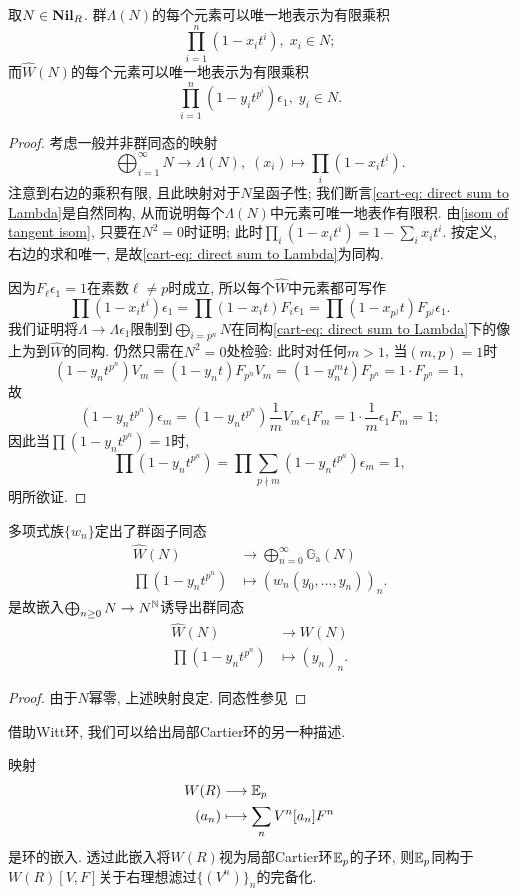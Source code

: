 \begin{lemma}
    取$N\in\mathbf{Nil}_R$.
    群$\Lambda(N)$的每个元素可以唯一地表示为有限乘积\[\prod_{i=1}^n \left( 1- x_it^i \right),\; x_i\in N;\]
    而$\hat{W}(N)$的每个元素可以唯一地表示为有限乘积\[\prod_{i=1}^n \left( 1- y_it^{p^i} \right)\epsilon_1,\; y_i\in N.\]
\end{lemma}
\begin{proof}
    考虑一般并非群同态的映射\begin{equation}\label{cart-eq: direct sum to Lambda}
        \bigoplus_{i=1}^\infty N\to\Lambda(N),\; (x_i)\mapsto\prod_i(1-x_it^i).
    \end{equation}
    注意到右边的乘积有限, 且此映射对于$N$呈函子性;
    我们断言{\cref{cart-eq: direct sum to Lambda}}是自然同构, 从而说明每个$\Lambda(N)$中元素可唯一地表作有限积.
    由\cref{isom of tangent isom}, 只要在$N^2 = 0$时证明;
    此时$\prod_i(1-x_it^i) = 1 - \sum_i x_it^i$. 按定义, 右边的求和唯一, 是故\cref{cart-eq: direct sum to Lambda}为同构.

    因为$F_\ell\epsilon_1 = 1$在素数$\ell\neq p$时成立, 所以每个$\hat{W}$中元素都可写作
    \[\prod(1-x_it^i)\epsilon_1 = \prod(1-x_it)F_i\epsilon_1 = \prod(1-x_{p^j}t)F_{p^j}\epsilon_1.\]
    我们证明将$\Lambda\to\Lambda\epsilon_1$限制到$\bigoplus_{i = p^n} N$在同构\cref{cart-eq: direct sum to Lambda}下的像上为到$\hat{W}$的同构.
    仍然只需在$N^2 = 0$处检验: 此时对任何$m > 1$, 当$(m, p) = 1$时
    \[(1-y_nt^{p^n})V_m = (1-y_nt)F_{p^n}V_m = (1-y_n^mt)F_{p^n} = 1\cdot F_{p^n} = 1,\]
    故\[(1-y_nt^{p^n})\epsilon_m = (1-y_nt^{p^n})\frac{1}{m}V_m\epsilon_1F_m = 1\cdot\frac{1}{m}\epsilon_1F_m  = 1;\]
    因此当$\prod (1-y_nt^{p^n}) = 1$时, \[\prod(1-y_nt^{p^n}) = \prod\sum_{p\nmid m}(1-y_nt^{p^n})\epsilon_m = 1,\]
    明所欲证.
\end{proof}

\begin{theorem}
    多项式族$\{w_n\}$定出了群函子同态\begin{align*}
        \hat{W}(N)&\longrightarrow \bigoplus_{n= 0}^\infty\mathbb{G}_{\mathrm{a}}(N)\\
        \prod (1-y_nt^{p^n})&\longmapsto (w_n(y_0, \dots, y_n))_n.
    \end{align*}
    是故嵌入$\bigoplus_{n\ge0}N\to N^{\mathbb{N}}$诱导出群同态\begin{align*}
        \hat{W}(N)&\longrightarrow W(N)\\
        \prod (1-y_nt^{p^n})&\longmapsto (y_n)_n.
    \end{align*}
\end{theorem}
\begin{proof}
    由于$N$幂零, 上述映射良定. 同态性参见\cite[Theorem 4.2.5]{Zi84}
\end{proof}
借助Witt环, 我们可以给出局部Cartier环的另一种描述.
\begin{corollary}
    映射\begin{align*}
        W(R)&\longrightarrow\mathbb{E}_p\\
        (a_n)&\longmapsto\sum_{n}V^n[a_n]F^n
    \end{align*}
    是环的嵌入. 透过此嵌入将$W(R)$视为局部Cartier环$\mathbb{E}_p$的子环,
    则$\mathbb{E}_p$同构于$W(R)[V, F]$关于右理想滤过$\{(V^n)\}_n$的完备化.
\end{corollary}


